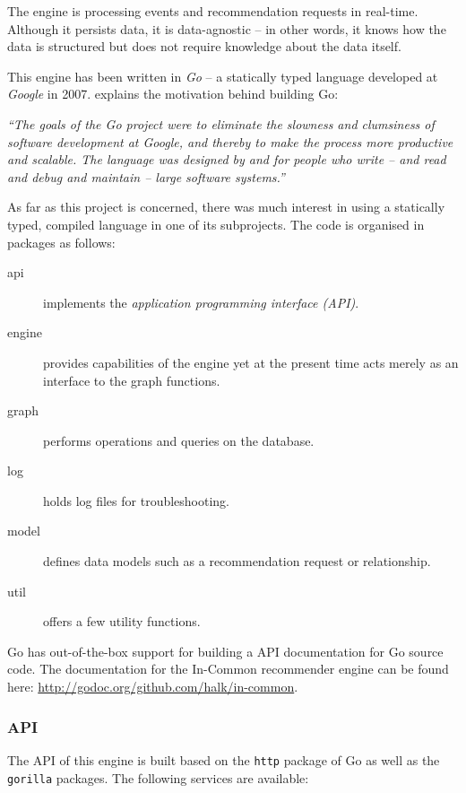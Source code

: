 The engine is processing events and recommendation requests in real-time. Although it persists data, it is data-agnostic -- in other words, it knows how the data is structured but does not require knowledge about the data itself.

This engine has been written in \emph{Go} -- a statically typed language developed at \emph{Google} in 2007. \citet{pike12} explains the motivation behind building Go:

\begin{adjustwidth}{1cm}{}
\emph{``The goals of the Go project were to eliminate the slowness and clumsiness of software development at Google, and thereby to make the process more productive and scalable. The language was designed by and for people who write -- and read and debug and maintain -- large software systems.''}
\end{adjustwidth}

As far as this project is concerned, there was much interest in using a statically typed, compiled language in one of its subprojects. The code is organised in packages as follows:

\begin{description}
    \item[api] implements the \emph{application programming interface (API)}.
    \item[engine] provides capabilities of the engine yet at the present time acts merely as an interface to the graph functions.
    \item[graph] performs operations and queries on the database.
    \item[log] holds log files for troubleshooting.
    \item[model] defines data models such as a recommendation request or relationship.
    \item[util] offers a few utility functions.
\end{description}

Go has out-of-the-box support for building a API documentation for Go source code. The documentation for the In-Common recommender engine can be found here: \url{http://godoc.org/github.com/halk/in-common}.

\subsubsection{API}

The API of this engine is built based on the \texttt{http} package of Go as well as the \texttt{gorilla} packages. The following services are available:

